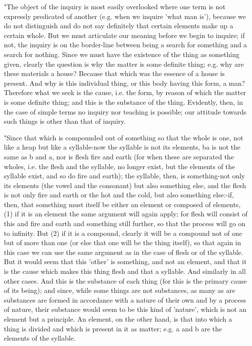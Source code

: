 "The object of the inquiry is most easily overlooked where one term
is not expressly predicated of another (e.g. when we inquire 'what
man is'), because we do not distinguish and do not say definitely
that certain elements make up a certain whole. But we must articulate
our meaning before we begin to inquire; if not, the inquiry is on
the border-line between being a search for something and a search
for nothing. Since we must have the existence of the thing as something
given, clearly the question is why the matter is some definite thing;
e.g. why are these materials a house? Because that which was the essence
of a house is present. And why is this individual thing, or this body
having this form, a man? Therefore what we seek is the cause, i.e.
the form, by reason of which the matter is some definite thing; and
this is the substance of the thing. Evidently, then, in the case of
simple terms no inquiry nor teaching is possible; our attitude towards
such things is other than that of inquiry. 

"Since that which is compounded out of something so that the whole
is one, not like a heap but like a syllable-now the syllable is not
its elements, ba is not the same as b and a, nor is flesh fire and
earth (for when these are separated the wholes, i.e. the flesh and
the syllable, no longer exist, but the elements of the syllable exist,
and so do fire and earth); the syllable, then, is something-not only
its elements (the vowel and the consonant) but also something else,
and the flesh is not only fire and earth or the hot and the cold,
but also something else:-if, then, that something must itself be either
an element or composed of elements, (1) if it is an element the same
argument will again apply; for flesh will consist of this and fire
and earth and something still further, so that the process will go
on to infinity. But (2) if it is a compound, clearly it will be a
compound not of one but of more than one (or else that one will be
the thing itself), so that again in this case we can use the same
argument as in the case of flesh or of the syllable. But it would
seem that this 'other' is something, and not an element, and that
it is the cause which makes this thing flesh and that a syllable.
And similarly in all other cases. And this is the substance of each
thing (for this is the primary cause of its being); and since, while
some things are not substances, as many as are substances are formed
in accordance with a nature of their own and by a process of nature,
their substance would seem to be this kind of 'nature', which is not
an element but a principle. An element, on the other hand, is that
into which a thing is divided and which is present in it as matter;
e.g. a and b are the elements of the syllable. 

